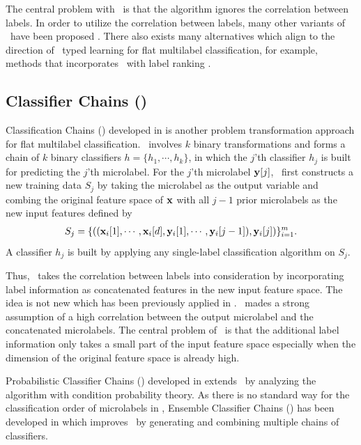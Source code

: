 {The central problem with \mlknn\ is that the algorithm ignores the correlation between labels.
In order to utilize the correlation between labels, many other variants of \mlknn\ have been proposed \citep{Cheng09combining,Younes11a}.
There also exists many alternatives which align to the direction of \knn\ typed learning for flat multilabel classification, for example, methods that incorporates \knn\ with label ranking \citep{Brinker07case,Chiang12a}.



%
%
\subsection{Classifier Chains (\cc)}

Classification Chains (\cc) developed in \citep{Read09classifier,Read11classifier} is another problem transformation approach for flat multilabel classification.
\cc\ involves $k$ binary transformations and forms a chain of $k$ binary classifiers $h=\{h_1,\cdots,h_k\}$, in which the $j$'th classifier $h_j$ is built for predicting the $j$'th microlabel.
For the $j$'th microlabel $\mathbf {y}[j]$, \cc\ first constructs a new training data $S_j$ by taking the microlabel as the output variable and combing the original feature space of $\mathbf {x}$ with all $j-1$ prior microlabels as the new input features defined by
\begin{align*}
	S_j = \{((\mathbf {x}_i[1],\cdots,\mathbf {x}_i[d],\mathbf {y}_i[1],\cdots,\mathbf {y}_i[j-1]),\mathbf {y}_i[j])\}_{i=1}^{m}.
\end{align*}
A classifier $h_j$ is built by applying any single-label classification algorithm on $S_j$.

Thus, \cc\ takes the correlation between labels into consideration by incorporating label information as concatenated features in the new input feature space.
The idea is not new which has been previously applied in \citep{Godbole04discriminative}.
\cc\ mades a strong assumption of a high correlation between the output microlabel and the concatenated microlabels.
The central problem of \cc\ is that the additional label information only takes a small part of the input feature space especially when the dimension of the original feature space is already high.

Probabilistic Classifier Chains (\pcc) developed in \citep{Read09classifier,Dembczynski10bayes} extends \cc\ by analyzing the algorithm with condition probability theory.
As there is no standard way for the classification order of microlabels in \cc, Ensemble Classifier Chains (\ecc) has been developed in \citep{Read11classifier} which improves \cc\ by generating and combining multiple chains of classifiers. 



}
